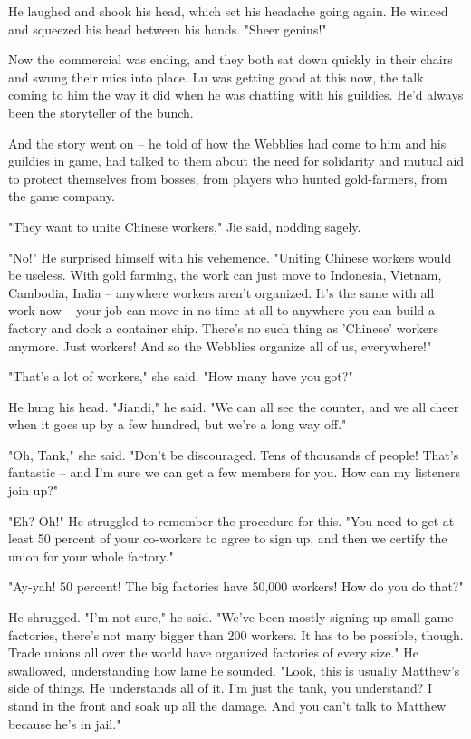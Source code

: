 He laughed and shook his head, which set his headache going again.
He winced and squeezed his head between his hands. "Sheer genius!"

Now the commercial was ending, and they both sat down quickly in
their chairs and swung their mics into place. Lu was getting good
at this now, the talk coming to him the way it did when he was
chatting with his guildies. He'd always been the storyteller of the
bunch.

And the story went on -- he told of how the Webblies had come to
him and his guildies in game, had talked to them about the need for
solidarity and mutual aid to protect themselves from bosses, from
players who hunted gold-farmers, from the game company.

"They want to unite Chinese workers," Jie said, nodding sagely.

"No!" He surprised himself with his vehemence. "Uniting Chinese
workers would be useless. With gold farming, the work can just move
to Indonesia, Vietnam, Cambodia, India -- anywhere workers aren't
organized. It's the same with all work now -- your job can move in
no time at all to anywhere you can build a factory and dock a
container ship. There's no such thing as 'Chinese' workers anymore.
Just workers! And so the Webblies organize all of us, everywhere!"

"That's a lot of workers," she said. "How many have you got?"

He hung his head. "Jiandi," he said. "We can all see the counter,
and we all cheer when it goes up by a few hundred, but we're a long
way off."

"Oh, Tank," she said. "Don't be discouraged. Tens of thousands of
people! That's fantastic -- and I'm sure we can get a few members
for you. How can my listeners join up?"

"Eh? Oh!" He struggled to remember the procedure for this. "You
need to get at least 50 percent of your co-workers to agree to sign
up, and then we certify the union for your whole factory."

"Ay-yah! 50 percent! The big factories have 50,000 workers! How do
you do that?"

He shrugged. "I'm not sure," he said. "We've been mostly signing up
small game-factories, there's not many bigger than 200 workers. It
has to be possible, though. Trade unions all over the world have
organized factories of every size." He swallowed, understanding how
lame he sounded. "Look, this is usually Matthew's side of things.
He understands all of it. I'm just the tank, you understand? I
stand in the front and soak up all the damage. And you can't talk
to Matthew because he's in jail."


